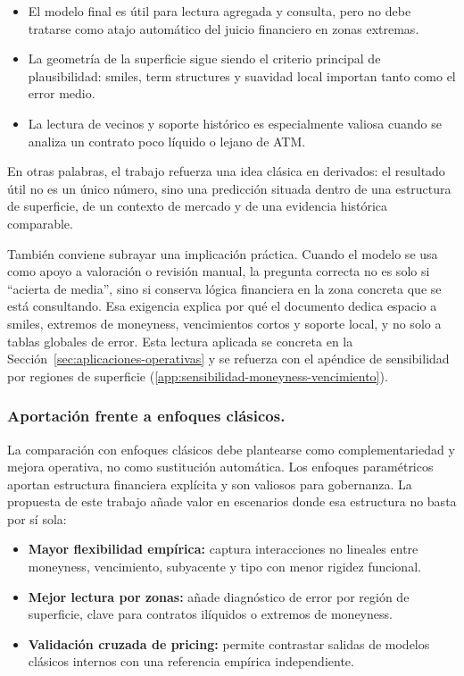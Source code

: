 \begin{itemize}
  \item El modelo final es útil para lectura agregada y consulta, pero no debe tratarse como atajo automático del juicio financiero en zonas extremas.
  \item La geometría de la superficie sigue siendo el criterio principal de plausibilidad: smiles, term structures y suavidad local importan tanto como el error medio.
  \item La lectura de vecinos y soporte histórico es especialmente valiosa cuando se analiza un contrato poco líquido o lejano de ATM.
\end{itemize}

En otras palabras, el trabajo refuerza una idea clásica en derivados: el resultado útil no es un único número, sino una predicción situada dentro de una estructura de superficie, de un contexto de mercado y de una evidencia histórica comparable.

También conviene subrayar una implicación práctica. Cuando el modelo se usa como apoyo a valoración o revisión manual, la pregunta correcta no es solo si ``acierta de media'', sino si conserva lógica financiera en la zona concreta que se está consultando. Esa exigencia explica por qué el documento dedica espacio a smiles, extremos de moneyness, vencimientos cortos y soporte local, y no solo a tablas globales de error. Esta lectura aplicada se concreta en la Sección~\ref{sec:aplicaciones-operativas} y se refuerza con el apéndice de sensibilidad por regiones de superficie (\ref{app:sensibilidad-moneyness-vencimiento}).

\subsubsection*{Aportación frente a enfoques clásicos.}

La comparación con enfoques clásicos debe plantearse como complementariedad y mejora operativa, no como sustitución automática. Los enfoques paramétricos aportan estructura financiera explícita y son valiosos para gobernanza. La propuesta de este trabajo añade valor en escenarios donde esa estructura no basta por sí sola:

\begin{itemize}
  \item \textbf{Mayor flexibilidad empírica:} captura interacciones no lineales entre moneyness, vencimiento, subyacente y tipo con menor rigidez funcional.
  \item \textbf{Mejor lectura por zonas:} añade diagnóstico de error por región de superficie, clave para contratos ilíquidos o extremos de moneyness.
  \item \textbf{Validación cruzada de pricing:} permite contrastar salidas de modelos clásicos internos con una referencia empírica independiente.
\end{itemize}



